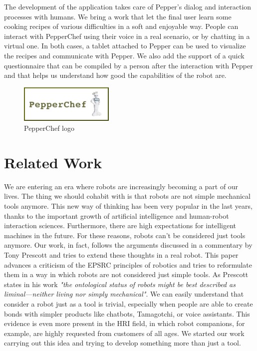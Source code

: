\documentclass[11pt]{article}
\begin{document}
The development of the application takes care of Pepper's dialog and interaction processes with humans. We bring a work that let the final user learn some cooking recipes of various difficulties in a soft and enjoyable way. People can interact with PepperChef using their voice in a real scenario, or by chatting in a virtual one. In both cases, a tablet attached to Pepper can be used to visualize the recipes and communicate with Pepper. We also add the support of a quick questionnaire that can be compiled by a person after the interaction with Pepper and that helps us understand how good the capabilities of the robot are.

\begin{figure}[!h]
\centering
\includegraphics[width=0.4\textwidth]{pepperchef}
\caption{PepperChef logo}
\label{fig:comb}
\end{figure}

\section{Related Work}\label{cha:rel}

We are entering an era where robots are increasingly becoming a part of our lives. The thing we should cohabit with is that robots are not simple mechanical tools anymore. This new way of thinking has been very popular in the last years, thanks to the important growth of artificial intelligence and human-robot interaction sciences. Furthermore, there are high expectations for intelligent machines in the future. For these reasons, robots can't be considered just tools anymore. Our work, in fact, follows the arguments discussed in a commentary by Tony Prescott \cite{prescott} and tries to extend these thoughts in a real robot. This paper advances a criticism of the EPSRC principles of robotics and tries to reformulate them in a way in which robots are not considered just simple tools. As Prescott states in his work \textit{"the ontological status of robots might be best described as liminal—neither living nor simply mechanical"}. We can easily understand that consider a robot just as a tool is trivial, especially when people are able to create bonds with simpler products like chatbots, Tamagotchi, or voice assistants. This evidence is even more present in the HRI field, in which robot companions, for example, are highly requested from customers of all ages. We started our work carrying out this idea and trying to develop something more than just a tool. 
\end{document}

